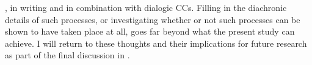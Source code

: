 , in writing and in combination with dialogic CCs. Filling in the diachronic details of such processes, or investigating whether or not such processes can be shown to have taken place at all, goes far beyond what the present study can achieve. I will return to these thoughts and their implications for future research as part of the final discussion in .
